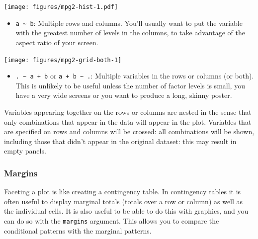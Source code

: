 \texttt{[image: figures/mpg2-hist-1.pdf]}

\begin{itemize}
\itemsep1pt\parskip0pt
\item
  \texttt{a \textasciitilde{} b}: Multiple rows and columns. You'll
  usually want to put the variable with the greatest number of levels in
  the columns, to take advantage of the aspect ratio of your screen.
\end{itemize}

\begin{Shaded}
\begin{Highlighting}[]
\NormalTok{>}\StringTok{ } \StringTok{ }\StringTok{ }
\end{Highlighting}
\end{Shaded}

\texttt{[image: figures/mpg2-grid-both-1]}

\begin{itemize}
\itemsep1pt\parskip0pt
\item
  \texttt{. \textasciitilde{} a + b} or
  \texttt{a + b \textasciitilde{} .}: Multiple variables in the rows or
  columns (or both). This is unlikely to be useful unless the number of
  factor levels is small, you have a very wide screens or you want to
  produce a long, skinny poster.
\end{itemize}

Variables appearing together on the rows or columns are nested in the
sense that only combinations that appear in the data will appear in the
plot. Variables that are specified on rows and columns will be crossed:
all combinations will be shown, including those that didn't appear in
the original dataset: this may result in empty panels.

\subsubsection{Margins}\label{sub:margins}

Faceting a plot is like creating a contingency table. In contingency
tables it is often useful to display marginal totals (totals over a row
or column) as well as the individual cells. It is also useful to be able
to do this with graphics, and you can do so with the \texttt{margins}
argument. This allows you to compare the conditional patterns with the
marginal patterns. 

